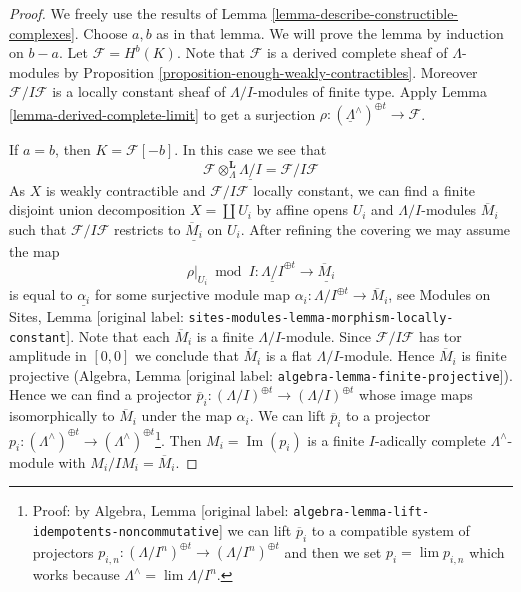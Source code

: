 \documentclass[10pt,a4paper]{article}
\theoremstyle{plain}
\theoremstyle{definition}
\theoremstyle{remark}
\numberwithin{equation}{subsection}
\def\lim{\mathop{\mathrm{lim}}\nolimits}
\def\Im{\mathop{\mathrm{Im}}}
\begin{document}
\begin{proof}
We freely use the results of
Lemma \ref{lemma-describe-constructible-complexes}.
Choose $a, b$ as in that lemma. We will prove the lemma by
induction on $b - a$. Let $\mathcal{F} = H^b(K)$.
Note that $\mathcal{F}$ is a derived complete sheaf of
$\Lambda$-modules by
Proposition \ref{proposition-enough-weakly-contractibles}.
Moreover $\mathcal{F}/I\mathcal{F}$ is a locally
constant sheaf of $\Lambda/I$-modules of finite type.
Apply Lemma \ref{lemma-derived-complete-limit} to get a surjection
$\rho : (\underline{\Lambda}^\wedge)^{\oplus t} \to \mathcal{F}$.

\medskip\noindent
If $a = b$, then $K = \mathcal{F}[-b]$. In this case we see that
$$
\mathcal{F} \otimes_\Lambda^\mathbf{L} \underline{\Lambda/I} =
\mathcal{F}/I\mathcal{F}
$$
As $X$ is weakly contractible and $\mathcal{F}/I\mathcal{F}$
locally constant, we can find a finite disjoint
union decomposition $X = \coprod U_i$ by affine opens $U_i$
and $\Lambda/I$-modules $\overline{M}_i$
such that $\mathcal{F}/I\mathcal{F}$ restricts to
$\underline{\overline{M}_i}$ on $U_i$. After refining the covering
we may assume the map
$$
\rho|_{U_i} \bmod I :
\underline{\Lambda/I}^{\oplus t}
\longrightarrow
\underline{\overline{M}_i}
$$
is equal to $\underline{\alpha_i}$ for some surjective module map
$\alpha_i : \Lambda/I^{\oplus t} \to \overline{M}_i$, see
Modules on Sites, Lemma \textnormal{[original label: \nolinkurl{sites-modules-lemma-morphism-locally-constant}]}.
Note that each $\overline{M}_i$ is a finite $\Lambda/I$-module.
Since $\mathcal{F}/I\mathcal{F}$ has tor amplitude in $[0, 0]$
we conclude that $\overline{M}_i$ is a flat $\Lambda/I$-module.
Hence $\overline{M}_i$ is finite projective
(Algebra, Lemma \textnormal{[original label: \nolinkurl{algebra-lemma-finite-projective}]}).
Hence we can find a projector
$\overline{p}_i : (\Lambda/I)^{\oplus t} \to (\Lambda/I)^{\oplus t}$
whose image maps isomorphically to $\overline{M}_i$ under the map $\alpha_i$.
We can lift $\overline{p}_i$ to a projector
$p_i : (\Lambda^\wedge)^{\oplus t} \to
(\Lambda^\wedge)^{\oplus t}$\footnote{Proof: by
Algebra, Lemma \textnormal{[original label: \nolinkurl{algebra-lemma-lift-idempotents-noncommutative}]}
we can lift $\overline{p}_i$ to a compatible system of
projectors $p_{i, n} : (\Lambda/I^n)^{\oplus t} \to (\Lambda/I^n)^{\oplus t}$
and then we set $p_i = \lim p_{i, n}$ which works because
$\Lambda^\wedge = \lim \Lambda/I^n$.}.
Then $M_i = \Im(p_i)$ is a finite $I$-adically complete
$\Lambda^\wedge$-module with $M_i/IM_i = \overline{M}_i$.

\end{proof}
\end{document}

